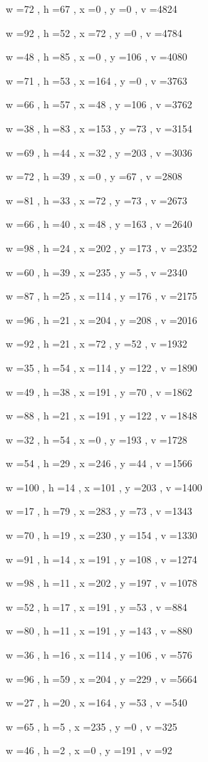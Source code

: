 \documentclass[11pt]{article}
\begin{document}
w =72 , h =67 , x =0 , y =0 , v =4824
\par
w =92 , h =52 , x =72 , y =0 , v =4784
\par
w =48 , h =85 , x =0 , y =106 , v =4080
\par
w =71 , h =53 , x =164 , y =0 , v =3763
\par
w =66 , h =57 , x =48 , y =106 , v =3762
\par
w =38 , h =83 , x =153 , y =73 , v =3154
\par
w =69 , h =44 , x =32 , y =203 , v =3036
\par
w =72 , h =39 , x =0 , y =67 , v =2808
\par
w =81 , h =33 , x =72 , y =73 , v =2673
\par
w =66 , h =40 , x =48 , y =163 , v =2640
\par
w =98 , h =24 , x =202 , y =173 , v =2352
\par
w =60 , h =39 , x =235 , y =5 , v =2340
\par
w =87 , h =25 , x =114 , y =176 , v =2175
\par
w =96 , h =21 , x =204 , y =208 , v =2016
\par
w =92 , h =21 , x =72 , y =52 , v =1932
\par
w =35 , h =54 , x =114 , y =122 , v =1890
\par
w =49 , h =38 , x =191 , y =70 , v =1862
\par
w =88 , h =21 , x =191 , y =122 , v =1848
\par
w =32 , h =54 , x =0 , y =193 , v =1728
\par
w =54 , h =29 , x =246 , y =44 , v =1566
\par
w =100 , h =14 , x =101 , y =203 , v =1400
\par
w =17 , h =79 , x =283 , y =73 , v =1343
\par
w =70 , h =19 , x =230 , y =154 , v =1330
\par
w =91 , h =14 , x =191 , y =108 , v =1274
\par
w =98 , h =11 , x =202 , y =197 , v =1078
\par
w =52 , h =17 , x =191 , y =53 , v =884
\par
w =80 , h =11 , x =191 , y =143 , v =880
\par
w =36 , h =16 , x =114 , y =106 , v =576
\par
w =96 , h =59 , x =204 , y =229 , v =5664
\par
w =27 , h =20 , x =164 , y =53 , v =540
\par
w =65 , h =5 , x =235 , y =0 , v =325
\par
w =46 , h =2 , x =0 , y =191 , v =92
\par
\newpage
\end{document}

